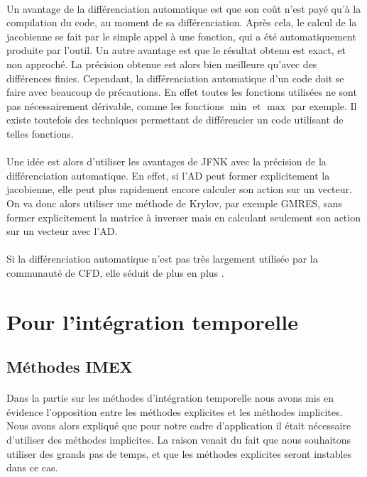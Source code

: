     \paragraph{}
    Un avantage de la différenciation automatique est que son coût n'est payé qu'à la compilation du code, au moment de sa différenciation.
    Après cela, le calcul de la jacobienne se fait par le simple appel à une fonction, qui a été automatiquement produite par l'outil.
    Un autre avantage est que le résultat obtenu est exact, et non approché.
    La précision obtenue est alors bien meilleure qu'avec des différences finies.
    Cependant, la différenciation automatique d'un code doit se faire avec beaucoup de précautions.
    En effet toutes les fonctions utilisées ne sont pas nécessairement dérivable, comme les fonctions $\min$ et $\max$ par exemple.
    Il existe toutefois des techniques permettant de différencier un code utilisant de telles fonctions.

    \paragraph{}
    Une idée est alors d'utiliser les avantages de JFNK avec la précision de la différenciation automatique.
    En effet, si l'AD peut former explicitement la jacobienne, elle peut plus rapidement encore calculer son action sur un vecteur.
    On va donc alors utiliser une méthode de Krylov, par exemple GMRES, sans former explicitement la matrice à inverser mais en calculant seulement son action sur un vecteur avec l'AD.

    \paragraph{}
    Si la différenciation automatique n'est pas très largement utilisée par la communauté de CFD, elle séduit de plus en plus \cite{BilanceriBeuxElmahiEtAl2011, KenwayMaderHeEtAl2019}.


\section{Pour l'intégration temporelle}

  \subsection{Méthodes IMEX}

    \paragraph{}
    Dans la partie sur les méthodes d’intégration temporelle nous avons mis en évidence l'opposition entre les méthodes explicites et les méthodes implicites.
    Nous avons alors expliqué que pour notre cadre d'application il était nécessaire d'utiliser des méthodes implicites.
    La raison venait du fait que nous souhaitons utiliser des grands pas de temps, et que les méthodes explicites seront instables dans ce cas.

